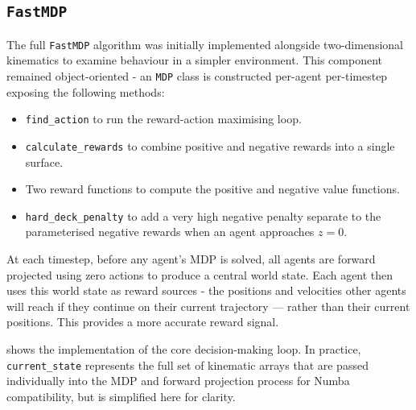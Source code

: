 \subsection{\texttt{FastMDP}}
\label{sec:3.3.1}

The full \texttt{FastMDP} algorithm was initially implemented alongside two-dimensional kinematics to examine behaviour in a simpler environment. This component remained object-oriented - an \texttt{MDP} class is constructed per-agent per-timestep exposing the following methods:

\begin{itemize}[nosep]
    \item \texttt{find\_action} to run the reward-action maximising loop.
    \item \texttt{calculate\_rewards} to combine positive and negative rewards into a single surface.
    \item Two reward functions to compute the positive and negative value functions. 
    \item \texttt{hard\_deck\_penalty} to add a very high negative penalty separate to the parameterised negative rewards when an agent approaches $z = 0$.
\end{itemize}

At each timestep, before any agent's MDP is solved, all agents are forward projected using zero actions to produce a central world state. Each agent then uses this world state as reward sources - the positions and velocities other agents will reach if they continue on their current trajectory — rather than their current positions. This provides a more accurate reward signal.

 shows the implementation of the core decision-making loop. In practice, \texttt{current\_state} represents the full set of kinematic arrays that are passed individually into the MDP and forward projection process for Numba compatibility, but is simplified here for clarity.

